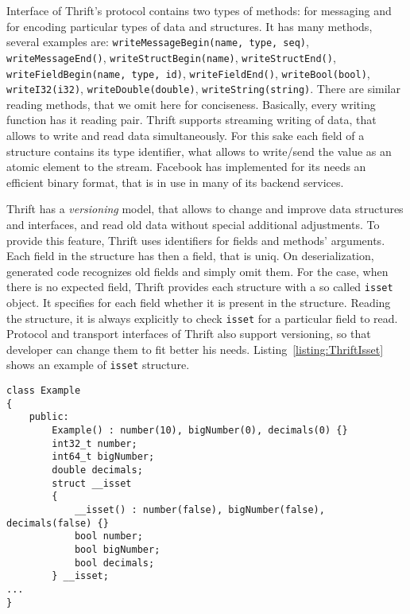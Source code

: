 Interface of Thrift's protocol contains two types of methods: for messaging and for encoding particular types of data and structures.
It has many methods, several examples are: \lstinline{writeMessageBegin(name, type, seq)}, \lstinline{writeMessageEnd()}, \lstinline{writeStructBegin(name)}, \lstinline{writeStructEnd()}, \lstinline{writeFieldBegin(name, type, id)}, \lstinline{writeFieldEnd()}, \lstinline{writeBool(bool)}, \lstinline{writeI32(i32)}, \lstinline{writeDouble(double)}, \lstinline{writeString(string)}.
There are similar reading methods, that we omit here for conciseness.
Basically, every writing function has it reading pair.
Thrift supports streaming writing of data, that allows to write and read data simultaneously.
For this sake each field of a structure contains its type identifier, what allows to write/send the value as an atomic element to the stream.
Facebook has implemented for its needs an efficient binary format, that is in use in many of its backend services.

Thrift has a \textit{versioning}  model, that allows to change and improve data structures and interfaces, and read old data without special additional adjustments.
To provide this feature, Thrift uses identifiers for fields and methods' arguments.
Each field in the structure has then a field, that is uniq.
On deserialization, generated code recognizes old fields and simply omit them.
For the case, when there is no expected field, Thrift provides each structure with a so called \lstinline{isset} object.
It specifies for each field whether it is present in the structure.
Reading the structure, it is always explicitly to check \lstinline{isset} for a particular field to read.
Protocol and transport interfaces of Thrift also support versioning, so that developer can change them to fit better his needs.
Listing~\ref{listing:ThriftIsset} shows an example of \lstinline{isset} structure.

\begin{lstlisting}[float=h, caption=Example of isset structure., label=listing:ThriftIsset]
class Example
{
	public:
		Example() :	number(10),	bigNumber(0), decimals(0) {}
		int32_t number;
		int64_t bigNumber;
		double decimals;
		struct __isset
		{
			__isset() :	number(false), bigNumber(false), decimals(false) {}
			bool number;
			bool bigNumber;
			bool decimals;
		} __isset;
...
}
\end{lstlisting}



